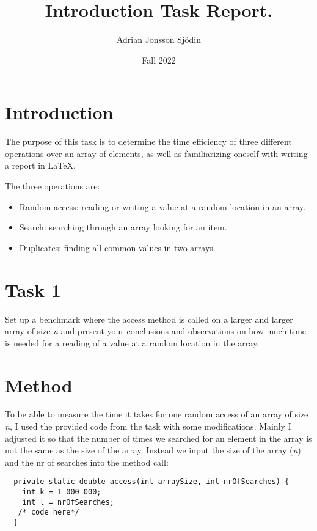 \documentclass[a4paper,11pt]{article}
\begin{document}
\title{
  \textbf{Introduction Task Report.}
}
\author{Adrian Jonsson Sjödin}
\date{Fall 2022}

\maketitle

\section*{Introduction}

The purpose of this task is to determine the time efficiency of three different operations
over an array of elements, as well as familiarizing oneself with writing a report in \LaTeX.

The three operations are:
\begin{itemize}
  \item Random access: reading or writing a value at a random location in an array.
  \item Search: searching through an array looking for an item.
  \item Duplicates: finding all common values in two arrays.
\end{itemize}

\section*{Task 1}

Set up a benchmark where the access method is called on a larger and larger array of size
\textit{n} and present your conclusions and observations on how much time is needed for a reading
of a value at a random location in the array.

\section*{Method}

To be able to measure the time it takes for one random access of an array of size
\textit{n}, I used the provided code from the task with some modifications. Mainly I adjusted
it so that the number of times we searched for an element in the array is not the same as
the size of the array. Instead we input the size of the array (\textit{n}) and the nr of
searches into the method call:

\begin{verbatim}
  private static double access(int arraySize, int nrOfSearches) {
    int k = 1_000_000;
    int l = nrOfSearches;
   /* code here*/
  }
\end{verbatim}
\end{document}
